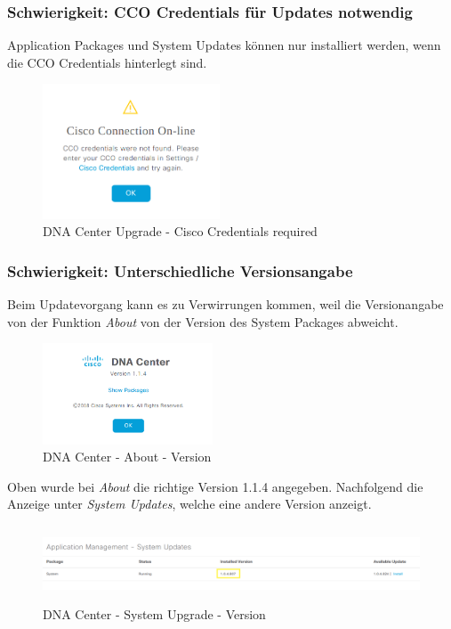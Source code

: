 \subsubsection{Schwierigkeit: CCO Credentials für Updates notwendig}

Application Packages und System Updates können nur installiert werden, wenn die CCO Credentials hinterlegt sind.

\begin{figure}[H]
	\centering
	\includegraphics[height=4cm]{img/dan-center-cisco-credentials-required.png}
	\caption{DNA Center Upgrade - Cisco Credentials required}
	\label{fig:dna-center-cisco-credentials-required}
\end{figure}

\subsubsection{Schwierigkeit: Unterschiedliche Versionsangabe}

Beim Updatevorgang kann es zu Verwirrungen kommen, weil die Versionangabe von der Funktion \textit{About} von der Version des System Packages abweicht.

\begin{figure}[H]
	\centering
	\includegraphics[height=3cm]{img/dna-center-about.png}
	\caption{DNA Center - About - Version}
	\label{fig:dna-center-about}
\end{figure}

Oben wurde bei \textit{About} die richtige Version 1.1.4 angegeben. Nachfolgend die Anzeige unter \textit{System Updates}, welche eine andere Version anzeigt.
\begin{figure}[H]
	\centering
	\includegraphics[height=2.25cm]{img/dna-center-system-upgrade-version.png}
	\caption{DNA Center - System Upgrade - Version}
	\label{fig:dna-center-system-upgrade}
\end{figure}

